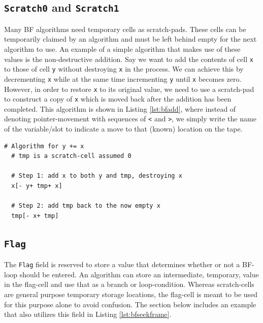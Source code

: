 \subsection{\texttt{Scratch0} and \texttt{Scratch1}}
Many BF algorithms need temporary cells as scratch-pads. These cells can be temporarily claimed by an algorithm and must be left behind empty for the next algorithm to use. An example of a simple algorithm that makes use of these values is the non-destructive addition. Say we want to add the contents of cell \texttt{x} to those of cell \texttt{y} without destroying \texttt{x} in the process. We can achieve this by decrementing \texttt{x} while at the same time incrementing \texttt{y} until \texttt{x} becomes zero. However, in order to restore \texttt{x} to its original value, we need to use a scratch-pad to construct a copy of \texttt{x} which is moved back after the addition has been completed. This algorithm is shown in Listing \ref{lst:bfadd}, where instead of denoting pointer-movement with sequences of \texttt{<} and \texttt{>}, we simply write the name of the variable/slot to indicate a move to that (known) location on the tape.

\begin{lstfloat}[H]
\begin{lstlisting}[style=brainfuck]
  # Algorithm for y += x
  # tmp is a scratch-cell assumed 0

  # Step 1: add x to both y and tmp, destroying x
  x[- y+ tmp+ x]

  # Step 2: add tmp back to the now empty x
  tmp[- x+ tmp]
\end{lstlisting}
\caption{Non-destructive addition of one cell to another, using a temporary scratch cell.}
\label{lst:bfadd}
\end{lstfloat}

\subsection{\texttt{Flag}}
The \texttt{Flag} field is reserved to store a value that determines whether or not a BF-loop should be entered. An algorithm can store an intermediate, temporary, value in the flag-cell and use that as a branch or loop-condition. Whereas scratch-cells are general purpose temporary storage locations, the flag-cell is meant to be used for this purpose alone to avoid confusion. The section below includes an example that also utilizes this field in Listing \ref{lst:bfseekframe}.

